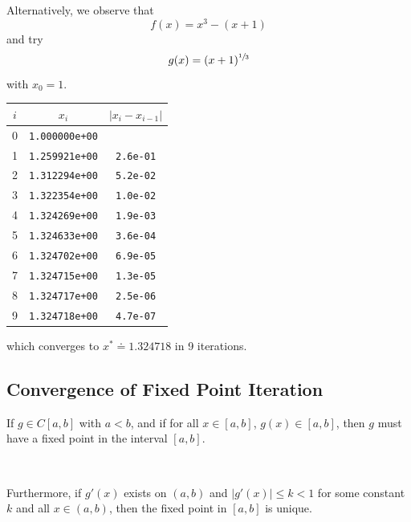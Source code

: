 \begin{example}
    Alternatively, we observe that \[
        f(x) = x^3 - (x + 1)
    \] and try \[
        g(x) = (x + 1)^{\sfrac{1}{3}}
    \] with \( x_0 = 1 \).

    \begin{table}[H]
        \centering
        \begin{tabular}{c|c|c}
            \( i \) & \( x_i \)             & \( | x_i - x_{i-1} | \)
            \\ \hline \hline
            0       & \texttt{1.000000e+00} &
            \\
            1       & \texttt{1.259921e+00} & \texttt{2.6e-01}
            \\
            2       & \texttt{1.312294e+00} & \texttt{5.2e-02}
            \\
            3       & \texttt{1.322354e+00} & \texttt{1.0e-02}
            \\
            4       & \texttt{1.324269e+00} & \texttt{1.9e-03}
            \\
            5       & \texttt{1.324633e+00} & \texttt{3.6e-04}
            \\
            6       & \texttt{1.324702e+00} & \texttt{6.9e-05}
            \\
            7       & \texttt{1.324715e+00} & \texttt{1.3e-05}
            \\
            8       & \texttt{1.324717e+00} & \texttt{2.5e-06}
            \\
            9       & \texttt{1.324718e+00} & \texttt{4.7e-07}
        \end{tabular}
    \end{table}
    which converges to \( x^\ast \doteq 1.324718 \) in 9 iterations.
\end{example}

\subsection{Convergence of Fixed Point Iteration}

\begin{theorem}
     If \( g \in C[a, b] \) with \( a < b \), and if for all \( x \in [a, b] \), \( g(x) \in [a, b] \), then \( g \) must have a fixed point in the interval \( [a, b] \).

        {~~~}

     Furthermore, if \( g'(x) \) exists on \( (a, b) \) and \( | g'(x) | \leq k < 1 \) for some constant \( k \) and all \( x \in (a, b) \), then the fixed point in \( [a, b] \) is unique.
\end{theorem}

